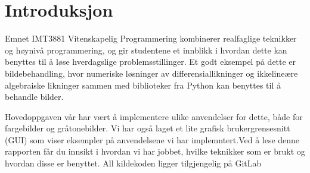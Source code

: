 \section{Introduksjon}

Emnet IMT3881 Vitenskapelig Programmering kombinerer realfaglige teknikker og høynivå programmering, og  gir studentene et innblikk i hvordan dette kan benyttes til å løse hverdagslige problemsstillinger. Et godt eksempel på dette er bildebehandling, hvor numeriske løsninger av differensiallikninger og ikkelineære algebraiske likninger sammen med biblioteker fra Python kan benyttes til å behandle bilder.

Hovedoppgaven vår har vært å implementere ulike anvendelser for dette, både for fargebilder og gråtonebilder. Vi har også laget et lite grafisk brukergrensesnitt (GUI) som viser eksempler på anvendelsene vi har implemntert.Ved å lese denne rapporten får du innsikt i hvordan vi har jobbet, hvilke teknikker som er brukt og hvordan disse er benyttet. All kildekoden ligger tilgjengelig på GitLab
